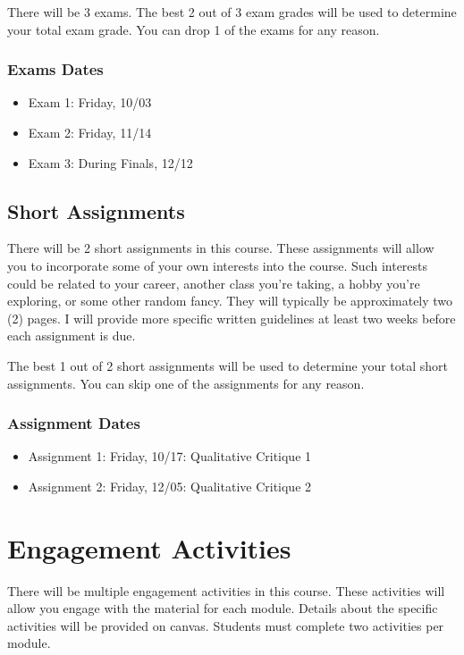 \documentclass[
]{book}
\begin{document}
There will be 3 exams. The best 2 out of 3 exam grades will be used to determine your total exam grade. You can drop 1 of the exams for any reason.

\subsubsection*{Exams Dates}\label{exams-dates}


\begin{itemize}
\item
  Exam 1: Friday, 10/03
\item
  Exam 2: Friday, 11/14
\item
  Exam 3: During Finals, 12/12
\end{itemize}

\subsection*{Short Assignments}\label{short-assignments}


There will be 2 short assignments in this course. These assignments will allow you to incorporate some of your own interests into the course. Such interests could be related to your career, another class you're taking, a hobby you're exploring, or some other random fancy. They will typically be approximately two (2) pages. I will provide more specific written guidelines at least two weeks before each assignment is due.

The best 1 out of 2 short assignments will be used to determine your total short assignments. You can skip one of the assignments for any reason.

\subsubsection*{Assignment Dates}\label{assignment-dates}


\begin{itemize}
\item
  Assignment 1: Friday, 10/17: Qualitative Critique 1
\item
  Assignment 2: Friday, 12/05: Qualitative Critique 2
\end{itemize}

\section*{Engagement Activities}\label{engagement-activities}


There will be multiple engagement activities in this course. These activities will allow you engage with the material for each module. Details about the specific activities will be provided on canvas. Students must complete two activities per module.
\end{document}
